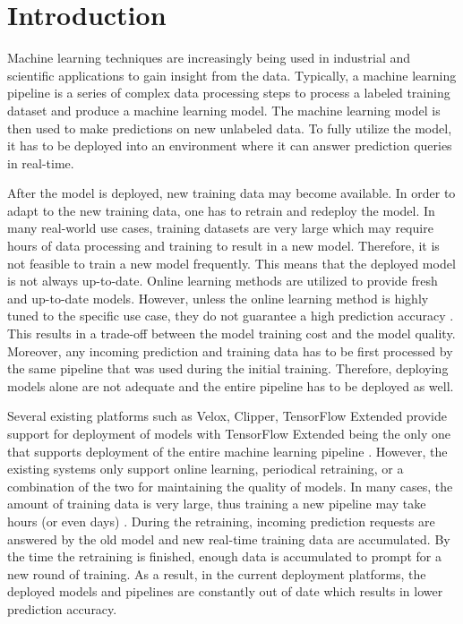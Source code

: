 \section{Introduction} \label{introduction}
Machine learning techniques are increasingly being used in industrial and scientific applications to gain insight from the data.
Typically, a machine learning pipeline is a series of complex data processing steps to process a labeled training dataset and produce a machine learning model.
The machine learning model is then used to make predictions on new unlabeled data.
To fully utilize the model, it has to be deployed into an environment where it can answer prediction queries in real-time.

After the model is deployed, new training data may become available.
In order to adapt to the new training data, one has to retrain and redeploy the model.
In many real-world use cases, training datasets are very large which may require hours of data processing and training to result in a new model.
Therefore, it is not feasible to train a new model frequently.
This means that the deployed model is not always up-to-date.
Online learning methods are utilized to provide fresh and up-to-date models.
However, unless the online learning method is highly tuned to the specific use case, they do not guarantee a high prediction accuracy \cite{ma2009identifying, macmahan2013}. 
This results in a trade-off between the model training cost and the model quality.
Moreover, any incoming prediction and training data has to be first processed by the same pipeline that was used during the initial training. 
Therefore, deploying models alone are not adequate and the entire pipeline has to be deployed as well.

Several existing platforms such as Velox, Clipper, TensorFlow Extended provide support for deployment of models with TensorFlow Extended being the only one that supports deployment of the entire machine learning pipeline \cite{crankshaw2014missing, crankshaw2016clipper, agarwal2014laser, baylor2017tfx}.
However, the existing systems only support online learning, periodical retraining, or a combination of the two for maintaining the quality of models.
In many cases, the amount of training data is very large, thus training a new pipeline may take hours (or even days) \cite{baylor2017tfx}.
During the retraining, incoming prediction requests are answered by the old model and new real-time training data are accumulated.
By the time the retraining is finished, enough data is accumulated to prompt for a new round of training.
As a result, in the current deployment platforms, the deployed models and pipelines are constantly out of date which results in lower prediction accuracy.

